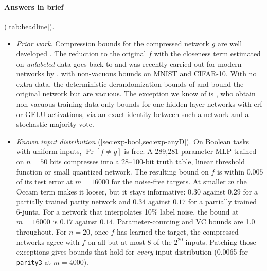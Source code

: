 \paragraph{Answers in brief} (\cref{tab:headline}).
\begin{itemize}
\item \emph{Prior work.} Compression bounds for the compressed network $g$ are well developed \cite{arora2018stronger,zhou2019nonvacuous,lotfi2022pac}. The reduction to the original $f$ with the closeness term estimated on \emph{unlabeled} data goes back to \citet{kaariainen2005generalization} and was recently carried out for modern networks by \citet{bazinet2026bound}, with non-vacuous bounds on MNIST and CIFAR-10. With no extra data, the deterministic derandomization bounds of \citet{neyshabur2018pacbayes} and \citet{nagarajan2019deterministic} bound the original network but are vacuous. The exception we know of is \citet{biggs2022nonvacuous}, who obtain non-vacuous training-data-only bounds for one-hidden-layer networks with erf or GELU activations, via an exact identity between such a network and a stochastic majority vote.
\item \emph{Known input distribution} (\cref{sec:exp-bool,sec:exp-anyD}). On Boolean tasks with uniform inputs, $\Pr[f\ne g]$ is free. A 289{,}281-parameter MLP trained on $n=50$ bits compresses into a 28--100-bit truth table, linear threshold function or small quantized network. The resulting bound on $f$ is within $0.005$ of its test error at $m=16000$ for the noise-free targets. At smaller $m$ the Occam term makes it looser, but it stays informative: $0.30$ against $0.29$ for a partially trained parity network and $0.34$ against $0.17$ for a partially trained 6-junta. For a network that interpolates 10\% label noise, the bound at $m=16000$ is $0.17$ against $0.14$. Parameter-counting and VC bounds are 1.0 throughout. For $n=20$, once $f$ has learned the target, the compressed networks agree with $f$ on all but at most 8 of the $2^{20}$ inputs. Patching those exceptions gives bounds that hold for \emph{every} input distribution (0.0065 for \texttt{parity3} at $m=4000$).

\end{itemize}

